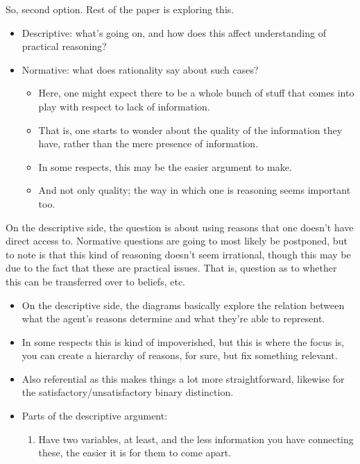 \documentclass[10pt]{article}
\begin{document}
So, second option.
Rest of the paper is exploring this.
\begin{itemize}
\item Descriptive: what's going on, and how does this affect understanding of practical reasoning?
\item Normative: what does rationality say about such cases?
  \begin{itemize}
  \item Here, one might expect there to be a whole bunch of stuff that comes into play with respect to lack of information.
  \item That is, one starts to wonder about the quality of the information they have, rather than the mere presence of information.
  \item In some respects, this may be the easier argument to make.
  \item And not only quality; the way in which one is reasoning seems important too.
  \end{itemize}
\end{itemize}

On the descriptive side, the question is about using reasons that one doesn't have direct access to.
Normative questions are going to most likely be postponed, but to note is that this kind of reasoning doesn't seem irrational, though this may be due to the fact that these are practical issues.
That is, question as to whether this can be transferred over to beliefs, etc.

\begin{itemize}
\item On the descriptive side, the diagrams basically explore the relation between what the agent's reasons determine and what they're able to represent.
\item In some respects this is kind of impoverished, but this is where the focus is, you can create a hierarchy of reasons, for sure, but fix something relevant.
\item Also referential as this makes things a lot more straightforward, likewise for the satisfactory/unsatisfactory binary distinction.
\end{itemize}


\begin{itemize}
\item Parts of the descriptive argument:
  \begin{enumerate}
  \item Have two variables, at least, and the less information you have connecting these, the easier it is for them to come apart.
  \end{enumerate}
\end{itemize}
\end{document}

